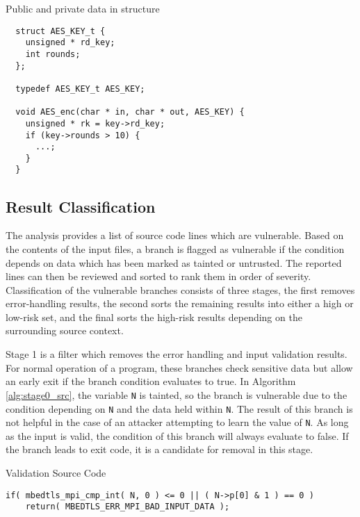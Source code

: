 \documentclass[11pt,a4paper]{article}
\begin{document}
\begin{algorithm} [H]
  \caption{Public and private data in structure}
  \label{alg:aes_struclt}
  \begin{lstlisting}
  struct AES_KEY_t {
    unsigned * rd_key;
    int rounds;
  };

  typedef AES_KEY_t AES_KEY;

  void AES_enc(char * in, char * out, AES_KEY) {
    unsigned * rk = key->rd_key;
    if (key->rounds > 10) {
      ...;
    }
  }
  \end{lstlisting}
\end{algorithm}

\subsection{Result Classification}

The analysis provides a list of source code lines which are vulnerable. Based on
the contents of the input files, a branch is flagged as vulnerable if the
condition depends on data which has been marked as tainted or untrusted. The
reported lines can then be reviewed and sorted to rank them in order of
severity. Classification of the vulnerable branches consists of three stages,
the first removes error-handling results, the second sorts the remaining results
into either a high or low-risk set, and the final sorts the high-risk results
depending on the surrounding source context.

Stage 1 is a filter which removes the error handling and input validation
results. For normal operation of a program, these branches check sensitive data
but allow an early exit if the branch condition evaluates to true. In Algorithm
\ref{alg:stage0_src}, the variable \texttt{N} is tainted, so the branch is
vulnerable due to the condition depending on \texttt{N} and the data held within
\texttt{N}. The result of this branch is not helpful in the case of an attacker
attempting to learn the value of \texttt{N}. As long as the input is valid, the
condition of this branch will always evaluate to false. If the branch leads to
exit code, it is a candidate for removal in this stage.

\begin{algorithm}
\caption{Validation Source Code}
\begin{lstlisting}
if( mbedtls_mpi_cmp_int( N, 0 ) <= 0 || ( N->p[0] & 1 ) == 0 )
    return( MBEDTLS_ERR_MPI_BAD_INPUT_DATA );
\end{lstlisting}
\label{alg:stage0_src}
\end{algorithm}
\end{document}
